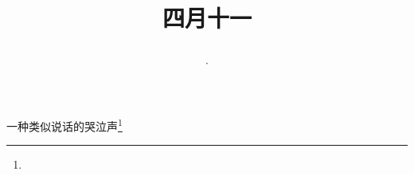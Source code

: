 \title{\date[d=18,m=5,y=2024][year:cn-y,年,month:cn,day:cn,日,·,weekday]·四月十一 }
一种类似说话的哭泣声\footnote{ }

